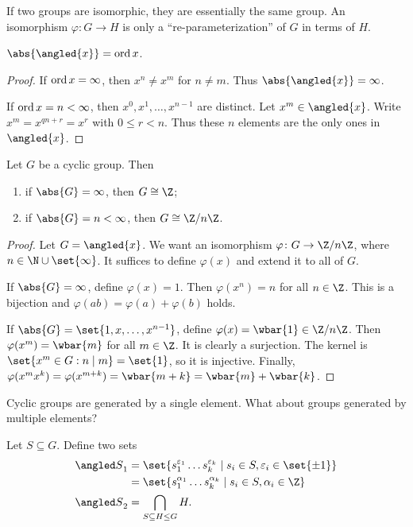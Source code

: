 If two groups are isomorphic, they are essentially the same group.
An isomorphism $\varphi\colon G \to H$ is only a ``re-parameterization''
of $G$ in terms of $H$.

\begin{lemma}
    $\abs{\angled{x}} = \ord x$.
\end{lemma}
\begin{proof}
    If $\operatorname{ord} x = \infty$, then $x^n \ne x^m$ for $n \ne m$.
    Thus $\abs{\angled{x}} = \infty$.

    If $\operatorname{ord} x = n < \infty$,
    then $x^0, x^1, \ldots, x^{n-1}$ are distinct.
    Let $x^m \in \angled{x}$.
    Write $x^m = x^{qn + r} = x^r$ with $0 \le r < n$.
    Thus these $n$ elements are the only ones in $\angled{x}$.
\end{proof}
\begin{proposition*}
    Let $G$ be a cyclic group.
    Then
    \begin{enumerate}
        \item if $\abs{G} = \infty$, then $G \cong \Z$;
        \item if $\abs{G} = n < \infty$, then $G \cong \Z/n\Z$.
    \end{enumerate}
\end{proposition*}
\begin{proof}
    Let $G = \angled{x}$.
    We want an isomorphism $\varphi\colon G \to \Z/n\Z$,
    where $n \in \N \cup \set{\infty}$.
    It suffices to define $\varphi(x)$ and extend it to all of $G$.

    If $\abs{G} = \infty$, define $\varphi(x) = 1$.
    Then $\varphi(x^n) = n$ for all $n \in \Z$.
    This is a bijection and $\varphi(ab) = \varphi(a) + \varphi(b)$ holds.

    If $\abs{G} = \set{1, x, \dots, x^{n-1}}$,
    define $\varphi(x) = \wbar{1} \in \Z/n\Z$.
    Then $\varphi(x^m) = \wbar{m}$ for all $m \in \Z$.
    It is clearly a surjection.
    The kernel is $\set{x^m \in G : n \mid m} = \set{1}$,
    so it is injective.
    Finally, $\varphi(x^m x^k) = \varphi(x^{m+k})
                      = \wbar{m+k}
                      = \wbar{m} + \wbar{k}$.
\end{proof}

Cyclic groups are generated by a single element.
What about groups generated by multiple elements?

Let $S \subseteq G$.
Define two sets \begin{align*}
  {\angled S}_1 &= \set{
        s_1^{\varepsilon_1} \dots s_k^{\varepsilon_k}
        \mid s_i \in S, \varepsilon_i \in \set{\pm 1}
    } \\
    &= \set{
        s_1^{\alpha_1} \dots s_k^{\alpha_k}
        \mid s_i \in S, \alpha_i \in \Z
    } \\
  {\angled S}_2 &= \bigcap_{S \subseteq H \le G} H.
\end{align*}

